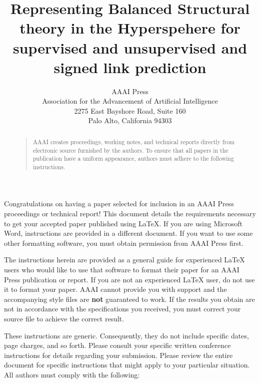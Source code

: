 \documentclass[letterpaper]{article}
\begin{document}
%
\title{Representing Balanced Structural theory in the Hyperspehere for supervised and unsupervised and signed link prediction}
\author{AAAI Press\\
Association for the Advancement of Artificial Intelligence\\
2275 East Bayshore Road, Suite 160\\
Palo Alto, California 94303\\
}
\maketitle
\begin{abstract}
\begin{quote}
AAAI creates proceedings, working notes, and technical reports directly from electronic source furnished by the authors. To ensure that all papers in the publication have a uniform appearance, authors must adhere to the following instructions. 
\end{quote}
\end{abstract}

\noindent Congratulations on having a paper selected for inclusion in an AAAI Press proceedings or technical report! This document details the requirements necessary to get your accepted paper published using \LaTeX{}. If you are using Microsoft Word, instructions are provided in a different document. If you want to use some other formatting software, you must obtain permission from AAAI Press first. 

The instructions herein are provided as a general guide for experienced \LaTeX{} users who would like to use that software to format their paper for an AAAI Press publication or report. If you are not an experienced \LaTeX{} user, do not use it to format your paper. AAAI cannot provide you with support and the accompanying style files are \textbf{not} guaranteed to work. If the results you obtain are not in accordance with the specifications you received, you must correct your source file to achieve the correct result. 

These instructions are generic. Consequently, they do not include specific dates, page charges, and so forth. Please consult your specific written conference instructions for details regarding your submission. Please review the entire document for specific instructions that might apply to your particular situation. All authors must comply with the following:
\end{document}

